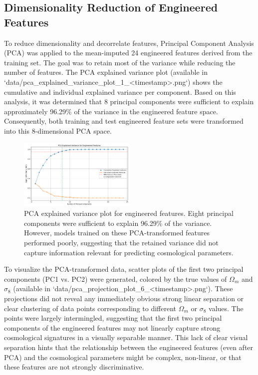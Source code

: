\documentclass[twocolumn]{aastex631}
\begin{document}
\subsection{Dimensionality Reduction of Engineered Features}

To reduce dimensionality and decorrelate features, Principal Component Analysis (PCA) was applied to the mean-imputed 24 engineered features derived from the training set. The goal was to retain most of the variance while reducing the number of features. The PCA explained variance plot (available in `data/pca\_explained\_variance\_plot\_1_<timestamp>.png`) shows the cumulative and individual explained variance per component. Based on this analysis, it was determined that 8 principal components were sufficient to explain approximately 96.29\% of the variance in the engineered feature space. Consequently, both training and test engineered feature sets were transformed into this 8-dimensional PCA space.

\begin{figure}[h!]
    \centering
    \includegraphics[width=0.5\textwidth]{../input_files/plots/pca_explained_variance_plot_1_20250527-134016.png}
    \caption{PCA explained variance plot for engineered features. Eight principal components were sufficient to explain 96.29\% of the variance. However, models trained on these PCA-transformed features performed poorly, suggesting that the retained variance did not capture information relevant for predicting cosmological parameters.}
    \label{fig:pca_explained_variance}
\end{figure}

To visualize the PCA-transformed data, scatter plots of the first two principal components (PC1 vs. PC2) were generated, colored by the true values of $\Omega_m$ and $\sigma_8$ (available in `data/pca\_projection\_plot\_6_<timestamp>.png`). These projections did not reveal any immediately obvious strong linear separation or clear clustering of data points corresponding to different $\Omega_m$ or $\sigma_8$ values. The points were largely intermingled, suggesting that the first two principal components of the engineered features may not linearly capture strong cosmological signatures in a visually separable manner. This lack of clear visual separation hints that the relationship between the engineered features (even after PCA) and the cosmological parameters might be complex, non-linear, or that these features are not strongly discriminative.
\end{document}
